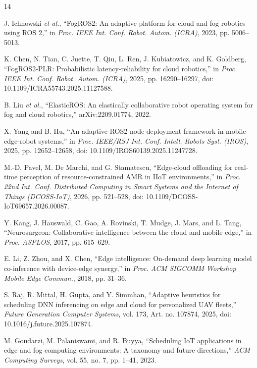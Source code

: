 \documentclass[conference,a4paper]{IEEEtran}
\newcommand{\etal}{\emph{et al.}}
\begin{document}
\begin{thebibliography}{14}
\setlength{\itemsep}{0pt plus 0.2pt}

J. Ichnowski \etal, ``FogROS2: An adaptive platform for cloud and fog robotics using ROS 2,'' in \emph{Proc. IEEE Int. Conf. Robot. Autom. (ICRA)}, 2023, pp. 5006--5013.

K. Chen, N. Tian, C. Juette, T. Qiu, L. Ren, J. Kubiatowicz, and K. Goldberg, ``FogROS2-PLR: Probabilistic latency-reliability for cloud robotics,'' in \emph{Proc. IEEE Int. Conf. Robot. Autom. (ICRA)}, 2025, pp. 16290--16297, doi: 10.1109/ICRA55743.2025.11127588.

B. Liu \etal, ``ElasticROS: An elastically collaborative robot operating system for fog and cloud robotics,'' arXiv:2209.01774, 2022.

X. Yang and B. Hu, ``An adaptive ROS2 node deployment framework in mobile edge-robot systems,'' in \emph{Proc. IEEE/RSJ Int. Conf. Intell. Robots Syst. (IROS)}, 2025, pp. 12652--12658, doi: 10.1109/IROS60139.2025.11247728.

M.-D. Pavel, M. De Marchi, and G. Stamatescu, ``Edge-cloud offloading for real-time perception of resource-constrained AMR in IIoT environments,'' in \emph{Proc. 22nd Int. Conf. Distributed Computing in Smart Systems and the Internet of Things (DCOSS-IoT)}, 2026, pp. 521--528, doi: 10.1109/DCOSS-IoT69657.2026.00087.

Y. Kang, J. Hauswald, C. Gao, A. Rovinski, T. Mudge, J. Mars, and L. Tang, ``Neurosurgeon: Collaborative intelligence between the cloud and mobile edge,'' in \emph{Proc. ASPLOS}, 2017, pp. 615--629.

E. Li, Z. Zhou, and X. Chen, ``Edge intelligence: On-demand deep learning model co-inference with device-edge synergy,'' in \emph{Proc. ACM SIGCOMM Workshop Mobile Edge Commun.}, 2018, pp. 31--36.

S. Raj, R. Mittal, H. Gupta, and Y. Simmhan, ``Adaptive heuristics for scheduling DNN inferencing on edge and cloud for personalized UAV fleets,'' \emph{Future Generation Computer Systems}, vol. 173, Art. no. 107874, 2025, doi: 10.1016/j.future.2025.107874.

M. Goudarzi, M. Palaniswami, and R. Buyya, ``Scheduling IoT applications in edge and fog computing environments: A taxonomy and future directions,'' \emph{ACM Computing Surveys}, vol. 55, no. 7, pp. 1--41, 2023.


\end{thebibliography}
\end{document}
